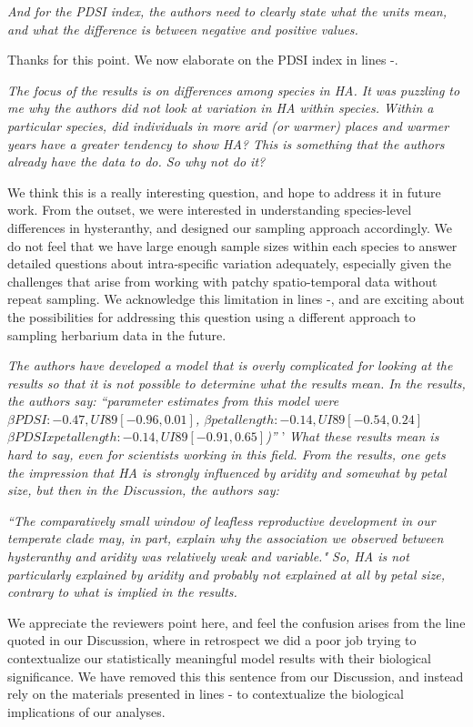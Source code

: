 \documentclass{article}[12pt]
\begin{document}
\emph{And for the PDSI index, the authors need to clearly state what the units mean, and what the difference is between negative and positive values.} 

Thanks for this point. We now elaborate on the PDSI index in lines -.

\emph{The focus of the results is on differences among species in HA.  It was puzzling to me why the authors did not look at variation in HA within species. Within a particular species, did individuals in more arid (or warmer) places and warmer years have a greater tendency to show HA? This is something that the authors already have the data to do. So why not do it?}

We think this is a really interesting question, and hope to address it in future work. From the outset, we were interested in understanding species-level differences in hysteranthy, and designed our sampling approach accordingly.
We do not feel that we have large enough sample sizes within each species to answer detailed questions about intra-specific variation adequately, especially given the challenges that arise from working with patchy spatio-temporal data without repeat sampling. We acknowledge this limitation in lines -, and are exciting about the possibilities for addressing this question using a different approach to sampling herbarium data in the future.

\emph{The authors have developed a model that is overly complicated for looking at the results so that it is not possible to determine what the results mean. In the results, the authors say: 
``parameter estimates from this model were $\beta PDSI : −0.47,UI89[−0.96,0.01]$, $\beta petal length : −0.14,UI89[−0.54,0.24]$ $\beta PDSIxpetal length : −0.14,UI89[−0.91,0.65]$)''}
'
\emph{What these results mean is hard to say, even for scientists working in this field.  From the results, one gets the impression that HA is strongly influenced by aridity and somewhat by petal size, but then in the Discussion, the authors say:}

\emph{``The comparatively small window of leafless reproductive development in our temperate clade may, in part, explain why the association we observed between hysteranthy and aridity was relatively weak and variable." So, HA is not particularly explained by aridity and probably not explained at all by petal size, contrary to what is implied in the results.}

We appreciate the reviewers point here, and feel the confusion arises from the line quoted in our Discussion, where in retrospect we did a poor job trying to contextualize our statistically meaningful model results with their biological significance. We have removed this this sentence from our Discussion, and instead rely on the materials presented in lines - to contextualize the biological implications of our analyses. 
\end{document}
